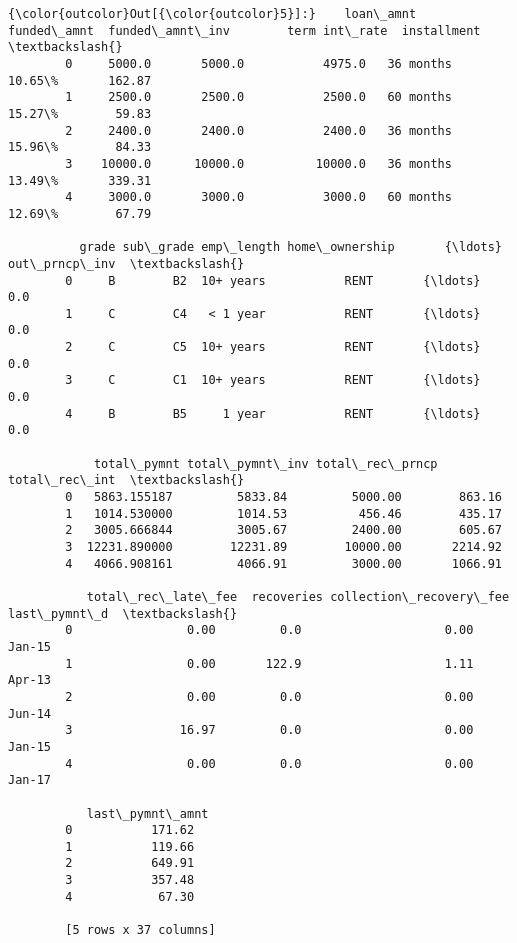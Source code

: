 \documentclass[11pt]{article}
\begin{document}
\begin{Verbatim}[commandchars=\\\{\}]
{\color{outcolor}Out[{\color{outcolor}5}]:}    loan\_amnt  funded\_amnt  funded\_amnt\_inv        term int\_rate  installment  \textbackslash{}
        0     5000.0       5000.0           4975.0   36 months   10.65\%       162.87   
        1     2500.0       2500.0           2500.0   60 months   15.27\%        59.83   
        2     2400.0       2400.0           2400.0   36 months   15.96\%        84.33   
        3    10000.0      10000.0          10000.0   36 months   13.49\%       339.31   
        4     3000.0       3000.0           3000.0   60 months   12.69\%        67.79   
        
          grade sub\_grade emp\_length home\_ownership       {\ldots}         out\_prncp\_inv  \textbackslash{}
        0     B        B2  10+ years           RENT       {\ldots}                   0.0   
        1     C        C4   < 1 year           RENT       {\ldots}                   0.0   
        2     C        C5  10+ years           RENT       {\ldots}                   0.0   
        3     C        C1  10+ years           RENT       {\ldots}                   0.0   
        4     B        B5     1 year           RENT       {\ldots}                   0.0   
        
            total\_pymnt total\_pymnt\_inv total\_rec\_prncp total\_rec\_int  \textbackslash{}
        0   5863.155187         5833.84         5000.00        863.16   
        1   1014.530000         1014.53          456.46        435.17   
        2   3005.666844         3005.67         2400.00        605.67   
        3  12231.890000        12231.89        10000.00       2214.92   
        4   4066.908161         4066.91         3000.00       1066.91   
        
           total\_rec\_late\_fee  recoveries collection\_recovery\_fee  last\_pymnt\_d  \textbackslash{}
        0                0.00         0.0                    0.00        Jan-15   
        1                0.00       122.9                    1.11        Apr-13   
        2                0.00         0.0                    0.00        Jun-14   
        3               16.97         0.0                    0.00        Jan-15   
        4                0.00         0.0                    0.00        Jan-17   
        
           last\_pymnt\_amnt  
        0           171.62  
        1           119.66  
        2           649.91  
        3           357.48  
        4            67.30  
        
        [5 rows x 37 columns]
\end{Verbatim}
            
\end{document}
